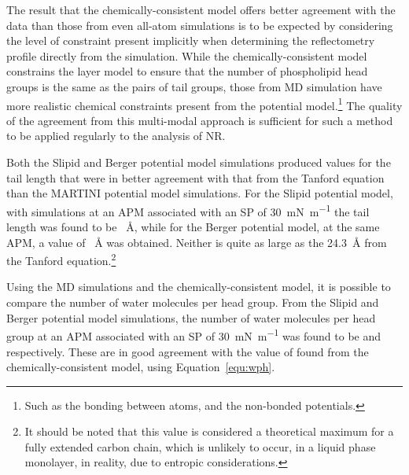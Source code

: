 The result that the chemically-consistent model offers better agreement with the data than those from even all-atom simulations is to be expected by considering the level of constraint present implicitly when determining the reflectometry profile directly from the simulation.
While the chemically-consistent model constrains the layer model to ensure that the number of phospholipid head groups is the same as the pairs of tail groups, those from MD simulation have more realistic chemical constraints present from the potential model.\footnote{Such as the bonding between atoms, and the non-bonded potentials.}
The quality of the agreement from this multi-modal approach is sufficient for such a method to be applied regularly to the analysis of NR.

Both the Slipid and Berger potential model simulations produced values for the tail length that were in better agreement with that from the Tanford equation than the MARTINI potential model simulations.
For the Slipid potential model, with simulations at an APM associated with an SP of \SI{30}{\milli\newton\per\meter} the tail length was found to be ~\si{\angstrom}, while for the Berger potential model, at the same APM, a value of ~\si{\angstrom} was obtained.
Neither is quite as large as the \SI{24.3}{\angstrom} from the Tanford equation.\footnote{It should be noted that this value is considered a theoretical maximum for a fully extended carbon chain, which is unlikely to occur, in a liquid phase monolayer, in reality, due to entropic considerations.}

Using the MD simulations and the chemically-consistent model, it is possible to compare the number of water molecules per head group.
From the Slipid and Berger potential model simulations, the number of water molecules per head group at an APM associated with an SP of \SI{30}{\milli\newton\per\meter} was found to be  and  respectively.
These are in good agreement with the value of  found from the chemically-consistent model, using Equation~\ref{equ:wph}.

